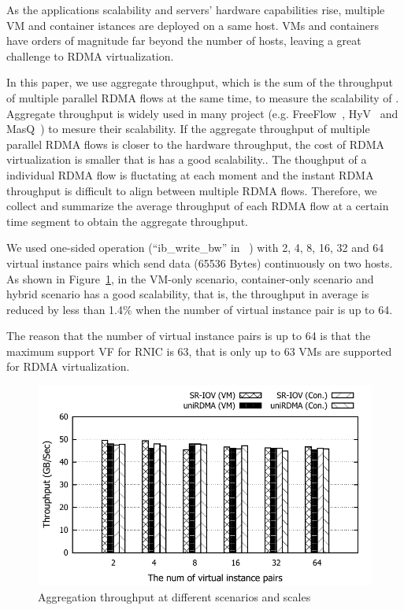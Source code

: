 As the applications scalability and servers' hardware capabilities rise, multiple VM and container istances are deployed on a same host. VMs and containers have orders of magnitude far beyond the number of hosts, leaving a great challenge to RDMA virtualization. 

In this paper, we use aggregate throughput, which is the sum of the throughput of multiple parallel RDMA flows at the same time, to measure the scalability of \sys{}. Aggregate throughput is widely used in many project (e.g. FreeFlow~\cite{kim2019freeflow}, HyV~\cite{pfefferle2015hybrid} and MasQ~\cite{he2020masq}) to mesure their scalability. If the aggregate throughput of multiple parallel RDMA flows is closer to the hardware throughput, the cost of RDMA virtualization is smaller that is \sys has a good scalability.. The thoughput of a individual RDMA flow is fluctating at each moment and the instant RDMA throughput is difficult to align between multiple RDMA flows. Therefore, we collect and summarize the average throughput of each RDMA flow at a certain time segment to obtain the aggregate throughput.

We used one-sided operation (``ib\_write\_bw'' in ~\cite{perftest}) with 2, 4, 8, 16, 32 and 64 virtual instance pairs which send data (65536 Bytes) continuously on two hosts. As shown in Figure~\ref{fig:scabality}, in the VM-only scenario, container-only scenario and hybrid scenario \sys has a good scalability, that is, the throughput in average is reduced by less than 1.4\% when the number of virtual instance pair is up to 64.

The reason that the number of virtual instance pairs is up to 64 is that the maximum support VF for RNIC is 63, that is only up to 63 VMs are supported for RDMA virtualization.

\begin{figure}[!ht]
	\centering
	\includegraphics[width=1.0\linewidth]{images/scabality.pdf}
	\caption{Aggregation throughput at different scenarios and scales}
	\label{fig:scabality}
\end{figure}

